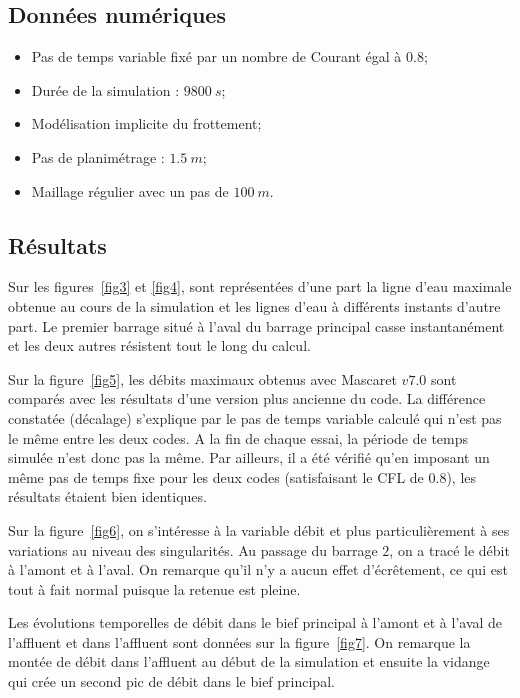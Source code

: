 \documentclass[a4paper,10pt]{article}
\begin{document}
\subsection*{Données numériques}

\begin{itemize}
 \item Pas de temps variable fixé par un nombre de Courant égal à $0.8$;
 \item Durée de la simulation : $9800\ s$;
 \item Modélisation implicite du frottement;
 \item Pas de planimétrage : $1.5\ m$;
 \item Maillage régulier avec un pas de $100\ m$.
\end{itemize}


\subsection*{Résultats}

Sur les figures~\ref{fig3} et \ref{fig4}, sont représentées d'une part la ligne d'eau maximale obtenue au cours de la simulation et les lignes d'eau à différents instants d'autre part. Le premier barrage situé à l'aval du barrage principal casse instantanément et les deux autres résistent tout le long du calcul.

Sur la figure~\ref{fig5}, les débits maximaux obtenus avec Mascaret $v7.0$ sont comparés avec les résultats d'une version plus ancienne du code. La différence constatée (décalage) s'explique par le pas de temps variable calculé qui n'est pas le même entre les deux codes. A la fin de chaque essai, la période de temps simulée n'est donc pas la même. Par ailleurs, il a été vérifié qu'en imposant un même pas de temps fixe pour les deux codes (satisfaisant le CFL de $0.8$), les résultats étaient bien identiques.

Sur la figure~\ref{fig6}, on s'intéresse à la variable débit et plus particulièrement à ses variations au niveau des singularités. Au passage du barrage $2$, on a tracé le débit à l'amont et à l'aval. On remarque qu'il n'y a aucun effet d'écrêtement, ce qui est tout à fait normal puisque la retenue est pleine.

Les évolutions temporelles de débit dans le bief principal à l'amont et à l'aval de l'affluent et dans l'affluent sont données sur la figure~\ref{fig7}. On remarque la montée de débit dans l'affluent au début de la simulation et ensuite la vidange qui crée un second pic de débit dans le bief principal.
\end{document}
